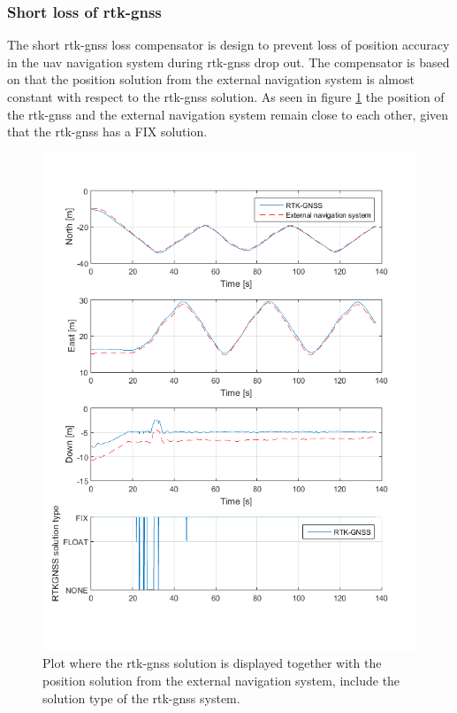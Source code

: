 \subsubsection{Short loss of \gls{rtk-gnss}}\label{ss:ShortLoss}
The short \gls{rtk-gnss} loss compensator is design to prevent loss of position accuracy in the \gls{uav} navigation system during \gls{rtk-gnss} drop out. The compensator is based on that the position solution from the external navigation system is almost constant with respect to the \gls{rtk-gnss} solution. As seen in figure \ref{Fig:RTKExternal} the position of the \gls{rtk-gnss} and the external navigation system remain close to each other, given that the \gls{rtk-gnss} has a FIX solution. 
\begin{figure}[H]
\centering
\includegraphics[scale=0.8]{figs/Experiment/RtkExternal.png}
\caption{Plot where the \gls{rtk-gnss} solution is displayed together with the position solution from the external navigation system, include the solution type of the \gls{rtk-gnss} system.}
\label{Fig:RTKExternal}
\end{figure}
